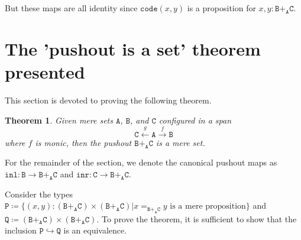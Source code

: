 \documentclass[12pt]{amsart}
\newcommand{\from}{\colon}
\newcommand{\xto}[1]{\xrightarrow{#1}}
\newcommand{\xgets}[1]{\xleftarrow{#1}}
\newcommand{\bydef}{\coloneqq}
\newcommand{\type}[1]{\mathtt{#1}}
\newcommand{\tin}{\colon}
\newcommand{\A}{\type{A}}
\newcommand{\B}{\type{B}}
\newcommand{\C}{\type{C}}
\renewcommand{\P}{\type{P}}
\newcommand{\Q}{\type{Q}}
\newcommand{\BAC}{\B +_{\A} \C}
\newcommand{\inl}{\type{inl}}
\newcommand{\inr}{\type{inr}}
\newcommand{\code}{\type{code}}
\newtheorem{thm}{Theorem}
\theoremstyle{remark}
\theoremstyle{definition}
\begin{document}
But these maps are all identity since \( \code (x,y) \) is a
proposition for \( x,y \tin \BAC \).   


\section{The 'pushout is a set' theorem presented}

This section is devoted to proving the following theorem.

\begin{thm} \label{thm:pushout-is-set}
  Given mere sets \( \A \), \( \B \), and \( \C \) configured in a
  span
  \[
    \C \xgets{g} \A \xto{f} \B
  \]
  where \( f \) is monic, then the pushout \( \BAC \) is a mere set.
\end{thm}

For the remainder of the section, we denote the canonical pushout maps
as
%
\(
  \inl \from \B \to \BAC
\)
%  
and
%
\(
  \inr \from \C \to \BAC.
\)
%
\par

Consider the types
%
\(
  \P \bydef
  \{ (x,y) \tin ( \BAC ) \times ( \BAC ) \vert
  x =_{\BAC} y \text{ is a mere proposition} \}
\)
%
and 
%
\(
  \Q \bydef (\BAC) \times (\BAC).
\)
%
To prove the theorem, it is sufficient to show that the inclusion
%
\(
  \P \hookrightarrow \Q
\)
%
is an equivalence. 

\end{document}

